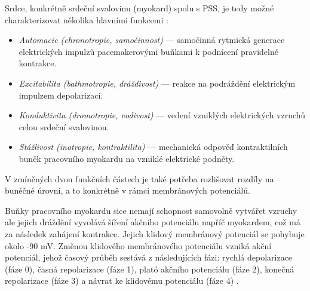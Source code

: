 Srdce, konkrétně srdeční svalovinu (myokard) spolu s PSS, je tedy možné
charakterizovat několika hlavními funkcemi \cite{Stejfa2006}:
\begin{itemize}
	\item \textit{Automacie (chronotropie, samočinnost)} --- samočinná rytmická
	      generace elektrických impulzů pacemakerovými buňkami k podnícení
	      pravidelné kontrakce.
	\item \textit{Excitabilita (bathmotropie, dráždivost)} --- reakce na
	      podráždění elektrickým impulzem depolarizací.
	\item \textit{Konduktivita (dromotropie, vodivost)} --- vedení vzniklých
	      elektrických vzruchů celou srdeční svalovinou.
	\item \textit{Stážlivost (inotropie, kontraktilita)} --- mechanická odpověď
	      kontraktilních buněk pracovního myokardu na vzniklé elektrické
	      podněty.
\end{itemize}

V zmíněných dvou funkčních částech je také potřeba rozlišovat rozdíly na buněčné
úrovní, a to konkrétně v rámci membránových potenciálů.

Buňky pracovního myokardu sice nemají schopnost samovolně vytvářet vzruchy ale
jejich dráždění vyvolává šíření akčního potenciálu napříč myokardem, což má za
následek zahájení kontrakce. Jejich klidový membránový potenciál se pohybuje
okolo -90 mV. Změnou klidového membránového potenciálu vzniká akční potenciál,
jehož časový průběh sestává z následujících fázi: rychlá depolarizace (fáze 0),
časná repolarizace (fáze 1), plató akčního potenciálu (fáze 2), konečná
repolarizace (fáze 3) a návrat ke klidovému potenciálu (fáze 4)
\cite{Petrek2019}.

